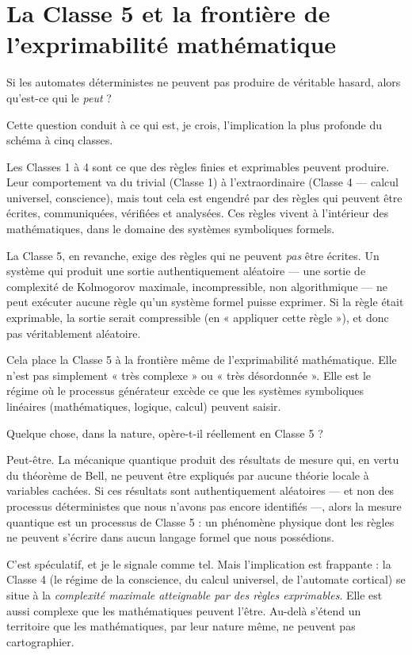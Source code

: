 \documentclass[11pt, twoside, openright]{book}
\begin{document}
\section*{La Classe 5 et la frontière de l'exprimabilité mathématique}

Si les automates déterministes ne peuvent pas produire de véritable hasard, alors qu'est-ce qui le \textit{peut} ?

Cette question conduit à ce qui est, je crois, l'implication la plus profonde du schéma à cinq classes.

Les Classes 1 à 4 sont ce que des règles finies et exprimables peuvent produire. Leur comportement va du trivial (Classe 1) à l'extraordinaire (Classe 4 --- calcul universel, conscience), mais tout cela est engendré par des règles qui peuvent être écrites, communiquées, vérifiées et analysées. Ces règles vivent à l'intérieur des mathématiques, dans le domaine des systèmes symboliques formels.

La Classe 5, en revanche, exige des règles qui ne peuvent \textit{pas} être écrites. Un système qui produit une sortie authentiquement aléatoire --- une sortie de complexité de Kolmogorov maximale, incompressible, non algorithmique --- ne peut exécuter aucune règle qu'un système formel puisse exprimer. Si la règle était exprimable, la sortie serait compressible (en « appliquer cette règle »), et donc pas véritablement aléatoire.

Cela place la Classe 5 à la frontière même de l'exprimabilité mathématique. Elle n'est pas simplement « très complexe » ou « très désordonnée ». Elle est le régime où le processus générateur excède ce que les systèmes symboliques linéaires (mathématiques, logique, calcul) peuvent saisir.

Quelque chose, dans la nature, opère-t-il réellement en Classe 5 ?

Peut-être. La mécanique quantique produit des résultats de mesure qui, en vertu du théorème de Bell, ne peuvent être expliqués par aucune théorie locale à variables cachées. Si ces résultats sont authentiquement aléatoires --- et non des processus déterministes que nous n'avons pas encore identifiés ---, alors la mesure quantique est un processus de Classe 5 : un phénomène physique dont les règles ne peuvent s'écrire dans aucun langage formel que nous possédions.

C'est spéculatif, et je le signale comme tel. Mais l'implication est frappante : la Classe 4 (le régime de la conscience, du calcul universel, de l'automate cortical) se situe à la \textit{complexité maximale atteignable par des règles exprimables}. Elle est aussi complexe que les mathématiques peuvent l'être. Au-delà s'étend un territoire que les mathématiques, par leur nature même, ne peuvent pas cartographier.
\end{document}
